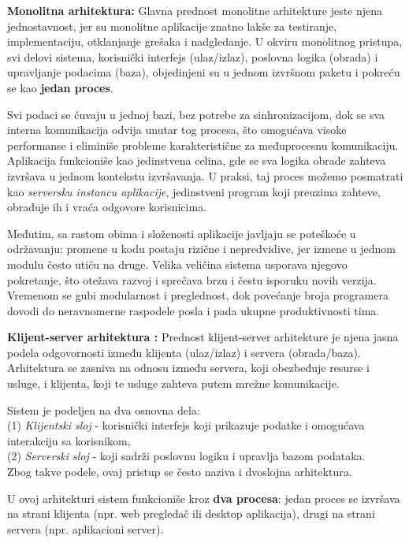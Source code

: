 \begin{description}

\item \textbf{Monolitna arhitektura:}
Glavna prednost monolitne arhitekture jeste njena jednostavnost, jer su monolitne aplikacije znatno lakše za testiranje, implementaciju, otklanjanje grešaka i nadgledanje. U okviru monolitnog pristupa, svi delovi sistema, korisnički interfejs (ulaz/izlaz), poslovna logika (obrada) i upravljanje podacima (baza), objedinjeni su u jednom izvršnom paketu i pokreću se kao \textbf{jedan proces}.

Svi podaci se čuvaju u jednoj bazi, bez potrebe za sinhronizacijom, dok se sva interna komunikacija odvija unutar tog procesa, što omogućava visoke performanse i eliminiše probleme karakteristične za međuprocesnu komunikaciju. Aplikacija funkcioniše kao jedinstvena celina, gde se sva logika obrade zahteva izvršava u jednom kontekstu izvršavanja. U praksi, taj proces možemo posmatrati kao \textit{serversku instancu aplikacije}, jedinstveni program koji preuzima zahteve, obrađuje ih i vraća odgovore korisnicima.

Međutim, sa rastom obima i složenosti aplikacije javljaju se poteškoće u održavanju: promene u kodu postaju rizične i nepredvidive, jer izmene u jednom modulu često utiču na druge. Velika veličina sistema usporava njegovo pokretanje, što otežava razvoj i sprečava brzu i čestu isporuku novih verzija. Vremenom se gubi modularnost i preglednost, dok povećanje broja programera dovodi do neravnomerne raspodele posla i pada ukupne produktivnosti tima.

\item \textbf{Klijent-server arhitektura \cite{berson1992client}:} 
Prednost klijent-server arhitekture je njena jasna podela odgovornosti između klijenta (ulaz/izlaz) i servera (obrada/baza). Arhitektura se zasniva na odnosu između servera, koji obezbeđuje resurse i usluge, i klijenta, koji te usluge zahteva putem mrežne komunikacije.

Sistem je podeljen na dva osnovna dela:\\
(1) \textit{Klijentski sloj} - korisnički interfejs koji prikazuje podatke i omogućava interakciju sa korisnikom,\\
(2) \textit{Serverski sloj} - koji sadrži poslovnu logiku i upravlja bazom podataka.\\
Zbog takve podele, ovaj pristup se često naziva i dvoslojna arhitektura.

U ovoj arhitekturi sistem funkcioniše kroz \textbf{dva procesa}: jedan proces se izvršava na strani klijenta (npr. web pregledač ili desktop aplikacija), drugi na strani servera (npr. aplikacioni server).


\end{description}
